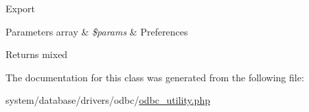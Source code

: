 Export


\begin{DoxyParams}[1]{Parameters}
array & {\em \$params} & Preferences \\
\hline
\end{DoxyParams}
\begin{DoxyReturn}{Returns}
mixed 
\end{DoxyReturn}


The documentation for this class was generated from the following file\+:\begin{DoxyCompactItemize}
\item 
system/database/drivers/odbc/\mbox{\hyperlink{odbc__utility_8php}{odbc\+\_\+utility.\+php}}\end{DoxyCompactItemize}
